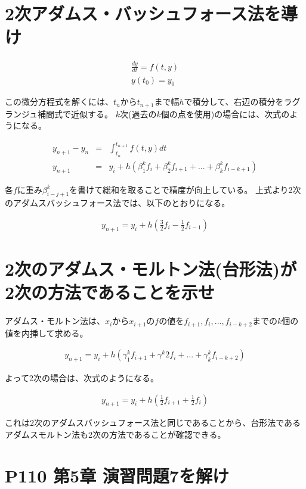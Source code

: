 \documentclass[]{jsarticle}
\begin{document}
\section{2次アダムス・バッシュフォース法を導け}


\begin{eqnarray*}
\frac{dy}{dt} = f(t,y)\\
y(t_{0}) = y_{0}
\end{eqnarray*}

この微分方程式を解くには、$t_{n}$から$t_{n+1}$まで幅$h$で積分して、右辺の積分をラグランジュ補間式で近似する。
$k$次(過去の$k$個の点を使用)の場合には、次式のようになる。

\begin{eqnarray*}
y_{n+1} - y_{n} &=& \int_{t_{n}}^{t_{n+1}} f(t,y) dt\\
y_{n+1} &=& y_{i} + h(\beta_{1}^{k} f_{i} + \beta_{2}^{k} f_{i+1} + ... + \beta_{k}^{k} f_{i-k+1})
\end{eqnarray*}

各$f$に重み$\beta_{i-j+1}^{k}$を書けて総和を取ることで精度が向上している。
上式より2次のアダムスバッシュフォース法では、以下のとおりになる。

\begin{eqnarray*}
y_{n+1} = y_{i} + h(\frac{3}{2} f_{i} - \frac{1}{2} f_{i-1})
\end{eqnarray*}


\section{2次のアダムス・モルトン法(台形法)が2次の方法であることを示せ}

アダムス・モルトン法は、$x_{i}$から$x_{i+1}$の$f$の値を$f_{i+1}, f_{i}, ... , f_{i-k+2}$までの$k$個の値を内挿して求める。

\begin{eqnarray*}
y_{n+1} = y_{i} + h(\gamma ^{k}_{1} f_{i+1} + \gamma ^{k}2 f_{i} + ... + \gamma ^{k}_{k} f_{i-k+2})
\end{eqnarray*}

よって2次の場合は、次式のようになる。

\begin{eqnarray*}
y_{n+1} = y_{i} + h(\frac{1}{2} f_{i+1} + \frac{1}{2} f_{i})
\end{eqnarray*}

これは2次のアダムスバッシュフォース法と同じであることから、台形法であるアダムスモルトン法も2次の方法であることが確認できる。


\section{P110 第5章 演習問題7を解け}
\end{document}
